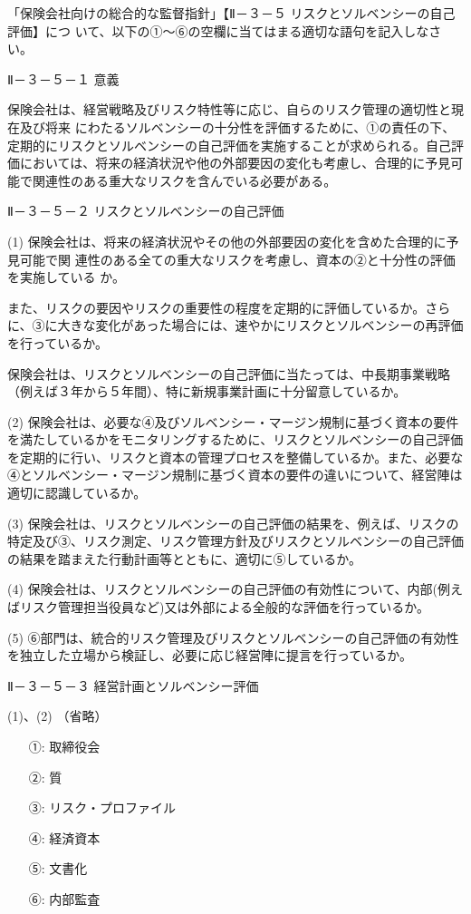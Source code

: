 \documentclass[report,gutter=10mm,fore-edge=10mm,uplatex,dvipdfmx]{jlreq}
\begin{document}
「保険会社向けの総合的な監督指針」【Ⅱ－３－５ リスクとソルベンシーの自己評価】につ
いて、以下の①～⑥の空欄に当てはまる適切な語句を記入しなさい。

Ⅱ－３－５－１ 意義

保険会社は、経営戦略及びリスク特性等に応じ、自らのリスク管理の適切性と現在及び将来
にわたるソルベンシーの十分性を評価するために、①の責任の下、定期的にリスクとソルベンシーの自己評価を実施することが求められる。自己評価においては、将来の経済状況や他の外部要因の変化も考慮し、合理的に予見可能で関連性のある重大なリスクを含んでいる必要がある。

Ⅱ－３－５－２ リスクとソルベンシーの自己評価

(1) 保険会社は、将来の経済状況やその他の外部要因の変化を含めた合理的に予見可能で関
連性のある全ての重大なリスクを考慮し、資本の②と十分性の評価を実施している
か。

また、リスクの要因やリスクの重要性の程度を定期的に評価しているか。さらに、③に大きな変化があった場合には、速やかにリスクとソルベンシーの再評価を行っているか。

保険会社は、リスクとソルベンシーの自己評価に当たっては、中長期事業戦略（例えば３年から５年間）、特に新規事業計画に十分留意しているか。

(2) 保険会社は、必要な④及びソルベンシー・マージン規制に基づく資本の要件を満たしているかをモニタリングするために、リスクとソルベンシーの自己評価を定期的に行い、リスクと資本の管理プロセスを整備しているか。また、必要な④とソルベンシー・マージン規制に基づく資本の要件の違いについて、経営陣は適切に認識しているか。

(3) 保険会社は、リスクとソルベンシーの自己評価の結果を、例えば、リスクの特定及び③、リスク測定、リスク管理方針及びリスクとソルベンシーの自己評価の結果を踏まえた行動計画等とともに、適切に⑤しているか。

(4) 保険会社は、リスクとソルベンシーの自己評価の有効性について、内部(例えばリスク管理担当役員など)又は外部による全般的な評価を行っているか。

(5) ⑥部門は、統合的リスク管理及びリスクとソルベンシーの自己評価の有効性を独立した立場から検証し、必要に応じ経営陣に提言を行っているか。

Ⅱ－３－５－３ 経営計画とソルベンシー評価

(1)、(2) （省略）

\answer{}
\begin{itemize}
\item[ ①: ]  取締役会
\item[ ②: ]  質
\item[ ③: ]  リスク・プロファイル
\item[ ④: ]  経済資本
\item[ ⑤: ]  文書化
\item[ ⑥: ]  内部監査
\end{itemize}
\end{document}
